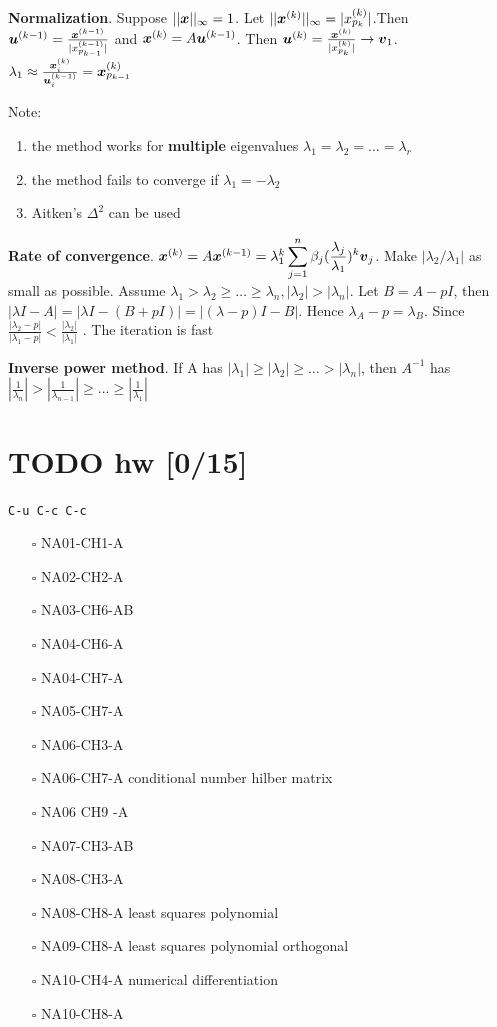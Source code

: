 \documentclass[11pt]{article}
\begin{document}
\textbf{Normalization}. Suppose \(||\boldsymbol{x}||_\infty=1\). Let
\(||\boldsymbol{x}^{(k)}||_\infty=|x_{p_k}^{(k)}|\).Then \(\boldsymbol{u}^{(k-1)}=
   \frac{\boldsymbol{x}^{(k-1)}}{|x_{p_{k-1}}^{(k-1)}|}\) and
\(\boldsymbol{x}^{(k)}=A\boldsymbol{u}^{(k-1)}\).
Then \(\boldsymbol{u}^{(k)}= \frac{\boldsymbol{x}^{(k)}}{|x_{p_k}^{(k)}|}\to \boldsymbol{v}_1\).
\(\lambda_1\approx
   \frac{\boldsymbol{x}_i^{(k)}}{\boldsymbol{u}_i^{(k-1)}}=\boldsymbol{x}_{p_{k-1}}^{(k)}\)

Note:
\begin{enumerate}
\item the method works for \textbf{multiple} eigenvalues
\(\lambda_1=\lambda_2=\dots=\lambda_r\)
\item the method fails to converge if \(\lambda_1=-\lambda_2\)
\item Aitken's \(\Delta^2\) can be used
\end{enumerate}


\textbf{Rate of convergence}. \(\boldsymbol{x}^{(k)}=A\boldsymbol{x}^{(k-1)}=\lambda_1^k
   \displaystyle\sum_{j=1}^n\beta_j(\frac{\lambda_j}{\lambda_1})^k\boldsymbol{v}_j\).
Make \(|\lambda_2/\lambda_1|\) as small as possible.
Assume \(\lambda_1>\lambda_2\ge\dots\ge\lambda_n, |\lambda_2|>|\lambda_n|\).
Let \(B=A-pI\), then \(|\lambda I-A|=|\lambda I-(B+pI)|=|(\lambda-p)I-B|\).
Hence \(\lambda_A-p=\lambda_B\). Since  \(\frac{|\lambda_2-p|}{|\lambda_1-p|}<
   \frac{|\lambda_2|}{|\lambda_1|}\) . The iteration is fast


\textbf{Inverse power method}. If A has
\(|\lambda_1|\ge|\lambda_2|\ge\dots>|\lambda_n|\), then \(A^{-1}\) has
\(|\frac{1}{\lambda_n}|>| \frac{1}{\lambda_{n-1}}|\ge\dots\ge|
   \frac{1}{\lambda_1}|\) 

\section{{\bfseries\sffamily TODO} hw [0/15]}
\label{sec:org904caae}
\texttt{C-u C-c C-c}
\begin{itemize}
\item[{$\square$}] NA01-CH1-A
\item[{$\square$}] NA02-CH2-A
\item[{$\square$}] NA03-CH6-AB
\item[{$\square$}] NA04-CH6-A
\item[{$\square$}] NA04-CH7-A
\item[{$\square$}] NA05-CH7-A
\item[{$\square$}] NA06-CH3-A
\item[{$\square$}] NA06-CH7-A
conditional number
hilber matrix
\item[{$\square$}] NA06 CH9 -A
\item[{$\square$}] NA07-CH3-AB
\item[{$\square$}] NA08-CH3-A
\item[{$\square$}] NA08-CH8-A
least squares polynomial
\item[{$\square$}] NA09-CH8-A
least squares polynomial orthogonal
\item[{$\square$}] NA10-CH4-A
numerical differentiation
\item[{$\square$}] NA10-CH8-A
\end{itemize}
\end{document}
